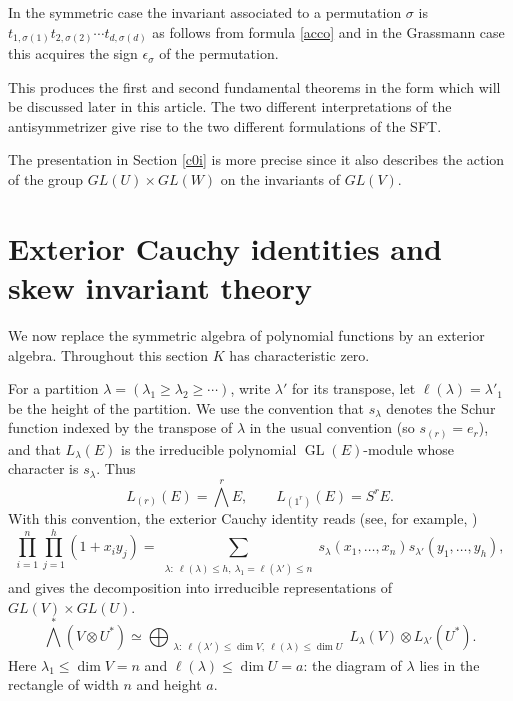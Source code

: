 \documentclass[10pt]{amsart}
\theoremstyle{definition}
\theoremstyle{remark}
\newcommand{\GL}{\operatorname{GL}}
\begin{document}
 
  In the symmetric case the invariant associated to a permutation $\sigma$  is $t_{1,\sigma(1)}t_{2,\sigma(2)}\cdots t_{d,\sigma(d)} $  as follows from  formula \eqref{acco} and   in the Grassmann case this acquires the sign $\epsilon_\sigma$ of the permutation.
  \smallskip


  This produces the first and second fundamental theorems in the form which will be discussed later in this article. The two different interpretations of the antisymmetrizer give rise to the two different formulations of the SFT.
  \smallskip


  The presentation in Section \ref{c0i} is more precise since it also describes the action of the group $GL(U)\times GL(W)$ on the invariants of $GL(V)$.
  
  \section{Exterior Cauchy identities and skew invariant theory\label{c0i}}

We now replace the symmetric algebra of polynomial functions by an exterior algebra.  Throughout this section $K$ has characteristic zero.  

For a partition $\lambda=(\lambda_1\geq\lambda_2\geq\cdots)$, write $\lambda'$ for its transpose, let $\ell(\lambda)=\lambda'_1$ be the height of the partition.  We use the convention that $s_\lambda$ denotes the Schur function indexed by the transpose of $\lambda$ in the usual convention (so $s_{(r)}=e_r$), and that $L_\lambda(E)$ is the irreducible polynomial $\GL(E)$-module whose character is $s_\lambda$.  Thus
\[
L_{(r)}(E)=\bigwedge^r E,
\qquad
L_{(1^r)}(E)=S^rE.
\]
With this convention, the exterior Cauchy identity reads (see, for example, \cite[Chapter~4]{Fulton})
\begin{equation}\label{Cauchy}
\prod_{i=1}^{n}\prod_{j=1}^{h}(1+x_i y_j)
=
\sum_{\substack{\lambda:\ \ell(\lambda)\le h,\ \lambda_1= \ell(\lambda')\le n}}
 s_\lambda(x_1,\ldots,x_n)s_{\lambda'}(y_1,\ldots,y_h),
\end{equation}
and gives the decomposition into irreducible representations of $GL(V)\times GL(U)$.
\begin{equation}\label{eq:exterior-cauchy}
\bigwedge^*(V\otimes U^*)
\simeq
\bigoplus_{\substack{\lambda:\  \ell(\lambda')\le \dim V,\ \ell(\lambda)\le \dim U}}
L_\lambda(V)\otimes L_{\lambda'}(U^*).
\end{equation}Here $\lambda_1\leq\dim V=n$ and $\ell(\lambda)\leq\dim U=a$: the diagram of $\lambda$ lies in the rectangle of width $n$ and height $a$.\medskip
\end{document}
